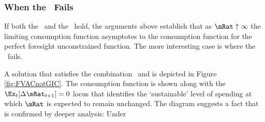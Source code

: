 \documentclass[BufferStockTheory]{subfiles}
\begin{document}
\hypertarget{The-GIC}{}
\hypertarget{When-the-GIC-Fails}{}
\subsubsection{When the \GIC~Fails}\label{sec:WhenTheGICFails}

If both the \GIC~and the \RIC~hold, the arguments above establish that as $\mRat \uparrow \infty$ the limiting consumption
function asymptotes to the consumption function for the perfect foresight unconstrained function.
The more interesting case is where the \GIC~fails.
\begin{comment}
  \WW{}{The same
    steps as above lead to the same implication that this requires
    $\InvEpShkInv < (\Rfree/\PGro)^{1/\CRRA}\uInvEpShkuInv^{1-1/\CRRA}$,
    but when the \RIC~$\Rfree/\PGro > 1$ holds this condition is much more
    easily satisfied.}
  If the \FVAC~holds but the \GIC~does not, the parameters must satisfy:
  \begin{align}
    \DiscFac \PGro^{1-\CRRA}\Ex[\pshk^{1-\CRRA}] & < 1 < (\Rfree\DiscFac)^{1/\CRRA}(\PGro\Ex[\pshk^{-1}])^{-1}. \label{eq:FVACnotGIC}
  \end{align}

  Note first that by Jensens's inequality $\Ex[\pshk^{1-\CRRA}] > 1$ and $(\Ex[\pshk^{-1}])^{-1} < 1$,
  so \eqref{eq:FVACnotGIC} is stronger than
  \begin{align}
    \DiscFac \PGro^{1-\CRRA} & < 1 < (\Rfree\DiscFac)^{1/\CRRA}/\PGro. \label{eq:PFFVACnotPFGIC}
  \end{align}


  Suppose $\PGro=1$, $\CRRA=2$ and $\pshk$ is lognormally distributed with $\sigma^{2}_{\pshk}=0.01$ (that is, $\log \pshk \sim \mathcal{N}(-\sigma_{\pShk}^{2}/2,\sigma_{\pShk}^{2})$) so that $\Ex_{t}[\pshk_{t+1}^{1-\CRRA}] =\Ex_{t}[\pshk_{t+1}^{-1}] =\exp(\sigma^{2}_{\pShk})=e^{0.01}.$  Then the condition becomes
  \begin{align}
    \DiscFac e^{0.01} & < 1 < (\Rfree \DiscFac)^{1/2}e^{-0.01}
  \end{align}
  which can be satisfied, for example, by $\DiscFac = 0.96$ and $\Rfree=1.08$.
\end{comment}
A solution that satisfies the combination \FVAC~and
\cncl{\GIC} is depicted in Figure \ref{fig:FVACnotGIC}.  The
consumption function is shown along with the $\Ex_{t}[\Delta
\mRat_{t+1}]=0$ locus that identifies the `sustainable' level of
spending at which $\mRat$ is expected to remain unchanged.  The
diagram suggests a fact that is confirmed by deeper analysis: Under
\end{document}
